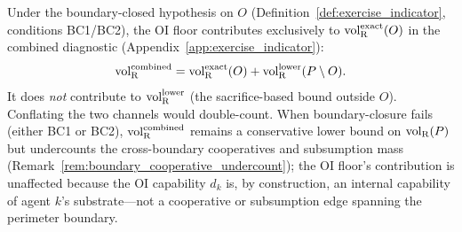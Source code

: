 \begin{remark}
Under the boundary-closed hypothesis on $O$
(Definition~\ref{def:exercise_indicator}, conditions BC1/BC2),
the OI floor contributes exclusively to ${\operatorname{vol}_{\mathrm{R}}^{\mathrm{exact}}}(O)$ in the
combined diagnostic (Appendix~\ref{app:exercise_indicator}):
\[
  {\operatorname{vol}_{\mathrm{R}}^{\mathrm{combined}}} = {\operatorname{vol}_{\mathrm{R}}^{\mathrm{exact}}}(O) + {\operatorname{vol}_{\mathrm{R}}^{\mathrm{lower}}}(P \setminus O).
\]
It does \emph{not} contribute to ${\operatorname{vol}_{\mathrm{R}}^{\mathrm{lower}}}$ (the
sacrifice-based bound outside $O$).  Conflating the two channels
would double-count.  When boundary-closure fails (either BC1 or
BC2), ${\operatorname{vol}_{\mathrm{R}}^{\mathrm{combined}}}$ remains a conservative lower bound on
${\operatorname{vol}_{\mathrm{R}}}(P)$ but undercounts the cross-boundary cooperatives and
subsumption mass
(Remark~\ref{rem:boundary_cooperative_undercount}); the OI
floor's contribution is unaffected because the OI capability
$d_k$ is, by construction, an internal capability of agent $k$'s
substrate---not a cooperative or subsumption edge spanning the
perimeter boundary.
\end{remark}
